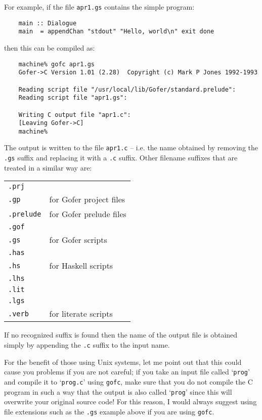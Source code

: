 For example, if the file \verb"apr1.gs" contains the simple program:
\begin{verbatim}
    main :: Dialogue
    main  = appendChan "stdout" "Hello, world\n" exit done
\end{verbatim}
then this can be compiled as:
\begin{verbatim}
    machine% gofc apr1.gs
    Gofer->C Version 1.01 (2.28)  Copyright (c) Mark P Jones 1992-1993
    
    Reading script file "/usr/local/lib/Gofer/standard.prelude":
    Reading script file "apr1.gs":
                   
    Writing C output file "apr1.c":
    [Leaving Gofer->C]
    machine% 
\end{verbatim}
The output is written to the file \verb"apr1.c" -- i.e. the name obtained by
removing the \verb".gs" suffix and replacing it with a \verb".c" suffix.  Other
filename suffixes that are treated in a similar way are:
\begin{center}
\begin{tabular}{|ll|} \hline
    \verb".prj"      &   \\
    \verb".gp"       &   for Gofer project files \\ \hline
    \verb".prelude"  &   for Gofer prelude files \\ \hline
    \verb".gof"      &   \\
    \verb".gs"       &   for Gofer scripts \\ \hline
    \verb".has"      &   \\
    \verb".hs"       &   for Haskell scripts \\ \hline
    \verb".lhs"      &   \\
    \verb".lit"      &   \\
    \verb".lgs"      &   \\
    \verb".verb"     &   for literate scripts \\ \hline
\end{tabular}
\end{center}

If no recognized suffix is found then the name of the output file is
obtained simply by appending the \verb".c" suffix to the input name.

For the benefit of those using Unix systems, let me point out that this
could cause you problems if you are not careful; if you take an input
file called `\verb"prog"' and compile it to `\verb"prog.c"' using \verb"gofc", make sure
that you do not compile the C program in such a way that the output is
also called `\verb"prog"' since this will overwrite your original source code!
For this reason, I would always suggest using file extensions such as
the \verb".gs" example above if you are using \verb"gofc".

